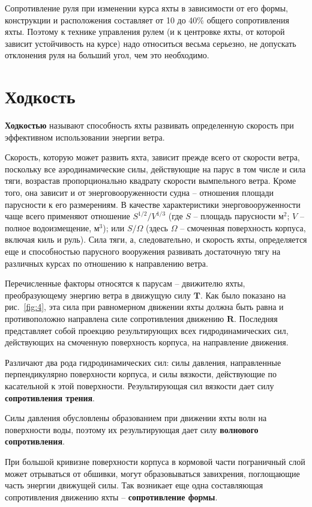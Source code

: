 \documentclass[a4paper, 12pt, twoside, final, book, russian, fittopage, cyremdash]{ncc}
\newcommand{\ve}[1]{\ensuremath{\mathbf{#1}}\xspace}
\newcommand{\ris}[1]{\ref{fig:#1}}
\begin{document}
Сопротивление руля при изменении курса яхты в зависимости от его формы, конструкции и расположения составляет от 10 до 40\% общего сопротивления яхты. Поэтому к технике управления рулем (и к центровке яхты, от которой зависит устойчивость на курсе) надо относиться весьма серьезно, не допускать отклонения руля на больший угол, чем это необходимо.

\section{Ходкость}

\textbf{Ходкостью} называют способность яхты развивать определенную скорость при эффективном использовании энергии ветра.

Скорость, которую может развить яхта, зависит прежде всего от скорости ветра, поскольку все аэродинамические силы, действующие на парус в том числе и сила тяги, возрастав пропорционально квадрату скорости вымпельного ветра. Кроме того, она зависит и от энерговооруженности судна \--- отношения площади парусности к его размерениям. В качестве характеристики энерговооруженности чаще всего применяют отношение $S^{1/2} / V^{1/3}$
(где $S$ \--- площадь парусности м$^2$; $V$ \--- полное водоизмещение, м$^3$); или $S / \Omega$ 
(здесь $\Omega$ \--- смоченная поверхность корпуса, включая киль и руль). Сила тяги, а, следовательно, и скорость яхты, определяется еще и способностью парусного вооружения развивать достаточную тягу на различных курсах по отношению к направлению ветра.

Перечисленные факторы относятся к парусам \--- движителю яхты, преобразующему энергию ветра в движущую силу \ve T. Как было показано на рис.~\ris{4}, эта сила при равномерном движении яхты должна быть равна и противоположно направлена силе сопротивления движению \ve R. Последняя представляет собой проекцию результирующих всех гидродинамических сил, действующих на смоченную поверхность корпуса, на направление движения.

Различают два рода гидродинамических сил: силы давления, направленные перпендикулярно поверхности корпуса, и силы вязкости, действующие по касательной к этой поверхности. Результирующая сил вязкости дает силу \textbf{сопротивления трения}. 

Силы давления обусловлены образованием при движении яхты волн на поверхности воды, поэтому их результирующая дает силу \textbf{волнового сопротивления}. 

При большой кривизне поверхности корпуса в кормовой части пограничный слой может отрываться от обшивки, могут образовываться завихрения, поглощающие часть энергии движущей силы. Так возникает еще одна составляющая сопротивления движению яхты \--- \textbf{сопротивление формы}.
\end{document}
